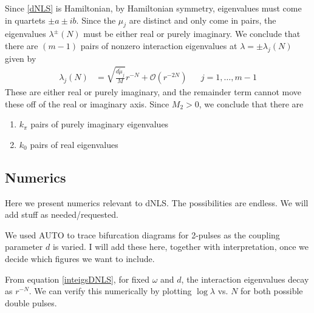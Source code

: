 \documentclass[12pt]{article}
\begin{document}
Since \eqref{dNLS} is Hamiltonian, by Hamiltonian symmetry, eigenvalues must come in quartets $\pm a \pm i b$. Since the $\mu_j$ are distinct and only come in pairs, the eigenvalues $\lambda^\pm(N)$ must be either real or purely imaginary. We conclude that there are $(m - 1)$ pairs of nonzero interaction eigenvalues at $\lambda = \pm \lambda_j(N)$ given by 
\begin{align}\label{inteigsDNLS}
\lambda_j(N) &= \sqrt{\frac{d \tilde{\mu}_j}{M}}r^{-N} + \mathcal{O}(r^{-2N}) && j = 1, \dots, m-1
\end{align}
These are either real or purely imaginary, and the remainder term cannot move these off of the real or imaginary axis. Since $M_2 > 0$, we conclude that there are
\begin{enumerate}
	\item $k_\pi$ pairs of purely imaginary eigenvalues
	\item $k_0$ pairs of real eigenvalues
\end{enumerate}



\subsection{Numerics}

Here we present numerics relevant to dNLS. The possibilities are endless. We will add stuff as needed/requested.

We used AUTO to trace bifurcation diagrams for 2-pulses as the coupling parameter $d$ is varied. I will add these here, together with interpretation, once we decide which figures we want to include.

From equation \eqref{inteigsDNLS}, for fixed $\omega$ and $d$, the interaction eigenvalues decay as $r^{-N}$. We can verify this numerically by plotting $\log \lambda$ vs. $N$ for both possible double pulses.
\end{document}
